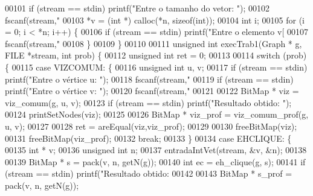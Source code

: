\begin{DoxyCode}
00101         \textcolor{keywordflow}{if} (stream == stdin) printf(\textcolor{stringliteral}{"Entre o tamanho do vetor: "});
00102         fscanf(stream,\textcolor{stringliteral}{"%
00103         *v = (\textcolor{keywordtype}{int} *) calloc(*n, \textcolor{keyword}{sizeof}(\textcolor{keywordtype}{int}));
00104         \textcolor{keywordtype}{int} i;
00105         \textcolor{keywordflow}{for} (i = 0; i < *n; i++) \{
00106                 \textcolor{keywordflow}{if} (stream == stdin) printf(\textcolor{stringliteral}{"Entre o elemento v[%
00107                 fscanf(stream,\textcolor{stringliteral}{"%
00108         \}
00109 \}
00110 
00111 \textcolor{keywordtype}{unsigned} \textcolor{keywordtype}{int} execTrab1(Graph * g, FILE *stream, \textcolor{keywordtype}{int} prob) \{
00112         \textcolor{keywordtype}{unsigned} \textcolor{keywordtype}{int} ret = 0;
00113 
00114         \textcolor{keywordflow}{switch} (prob) \{
00115         \textcolor{keywordflow}{case} VIZCOMUM: \{
00116                 \textcolor{keywordtype}{unsigned} \textcolor{keywordtype}{int} u, v;
00117                 \textcolor{keywordflow}{if} (stream == stdin) printf(\textcolor{stringliteral}{"Entre o vértice u: "});
00118                 fscanf(stream,\textcolor{stringliteral}{"%
00119                 \textcolor{keywordflow}{if} (stream == stdin) printf(\textcolor{stringliteral}{"Entre o vértice v: "});
00120                 fscanf(stream,\textcolor{stringliteral}{"%
00121 
00122                 BitMap * viz = viz_comum(g, u, v);
00123                 \textcolor{keywordflow}{if} (stream == stdin) printf(\textcolor{stringliteral}{"Resultado obtido: "});
00124                 printSetNodes(viz);
00125 
00126                 BitMap * viz\_prof = viz\_comum\_prof(g, u, v);
00127 
00128                 ret = areEqual(viz,viz\_prof);
00129 
00130                 freeBitMap(viz);
00131                 freeBitMap(viz\_prof);
00132                 \textcolor{keywordflow}{break};
00133         \}
00134         \textcolor{keywordflow}{case} EHCLIQUE: \{
00135                 \textcolor{keywordtype}{int} * v;
00136                 \textcolor{keywordtype}{unsigned} \textcolor{keywordtype}{int} n;
00137                 entradaIntVet(stream, &v, &n);
00138 
00139                 BitMap * s = pack(v, n, getN(g));
00140                 \textcolor{keywordtype}{int} ec = eh_clique(g, s);
00141                 \textcolor{keywordflow}{if} (stream == stdin) printf(\textcolor{stringliteral}{"Resultado obtido: %
00142 
00143                 BitMap * s\_prof = pack(v, n, getN(g));
}}}}}}
\end{DoxyCode}
